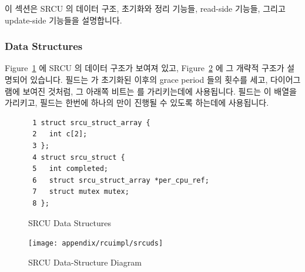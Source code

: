 이 섹션은 SRCU 의 데이터 구조, 초기화와 정리 기능들, read-side 기능들, 그리고
update-side 기능들을 설명합니다.

\subsubsection{Data Structures}
\label{sec:app:rcuimpl:Data Structures}

Figure~\ref{fig:app:rcuimpl:SRCU Data Structures} 에 SRCU 의 데이터 구조가
보여져 있고,
Figure~\ref{fig:app:whymb:SRCU Data-Structure Diagram} 에 그 개략적 구조가
설명되어 있습니다.
 필드는   가 초기화된 이후의 grace period
들의 횟수를 세고, 다이어그램에 보여진 것처럼, 그 아래쪽 비트는 
 를 가리키는데에 사용됩니다.
 필드는 이 배열을 가리키고,  필드는 한번에 하나의
 만이 진행될 수 있도록 하는데에 사용됩니다.

\begin{figure}[htbp]
{ \scriptsize
\begin{verbatim}
 1 struct srcu_struct_array {
 2   int c[2];
 3 };
 4 struct srcu_struct {
 5   int completed;
 6   struct srcu_struct_array *per_cpu_ref;
 7   struct mutex mutex;
 8 };
\end{verbatim}
}
\caption{SRCU Data Structures}
\label{fig:app:rcuimpl:SRCU Data Structures}
\end{figure}

\begin{figure}[htb]
\centering
\texttt{[image: appendix/rcuimpl/srcuds]}
\caption{SRCU Data-Structure Diagram}
\label{fig:app:whymb:SRCU Data-Structure Diagram}
\end{figure}

